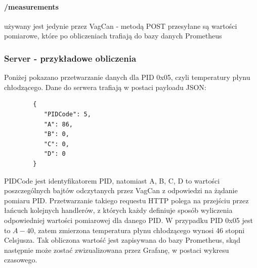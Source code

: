 \documentclass[10pt,a4paper]{scrartcl}
\begin{document}
		\paragraph{\slash measurements} używany jest jedynie przez VagCan - metodą POST przesyłane są wartości pomiarowe, które po obliczeniach trafiają do bazy danych Prometheus
		\subsubsection{Server - przykładowe obliczenia}
		Poniżej pokazano przetwarzanie danych dla PID 0x05, czyli temperatury płynu chłodzącego.
		Dane do serwera trafiają w postaci payloadu JSON:\\
		\begin{lstlisting}
		{
		   "PIDCode": 5,
		   "A": 86,
		   "B": 0,
		   "C": 0,
		   "D": 0
		}
		\end{lstlisting}
		PIDCode jest identyfikatorem PID, natomiast A, B, C, D to wartości poszczególnych bajtów odczytanych przez VagCan z odpowiedzi na żądanie pomiaru PID. Przetwarzanie takiego requestu HTTP polega na przejściu przez łańcuch kolejnych handlerów, z których każdy definiuje sposób wyliczenia odpowiedniej wartości pomiarowej dla danego PID. W przypadku PID 0x05 jest to
		$ A-40 $, zatem zmierzona temperatura płynu chłodzącego wynosi 46 stopni Celsjusza. Tak obliczona wartość jest zapisywana do bazy Prometheus, skąd następnie może zostać zwizualizowana przez Grafanę, w postaci wykresu czasowego.
\end{document}
